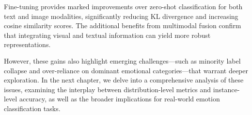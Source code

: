 Fine-tuning provides marked improvements over zero-shot classification for both text and image modalities, significantly reducing KL divergence and increasing cosine similarity scores. The additional benefits from multimodal fusion confirm that integrating visual and textual information can yield more robust representations.

However, these gains also highlight emerging challenges—such as minority label collapse and over-reliance on dominant emotional categories—that warrant deeper exploration. In the next chapter, we delve into a comprehensive analysis of these issues, examining the interplay between distribution-level metrics and instance-level accuracy, as well as the broader implications for real-world emotion classification tasks.





